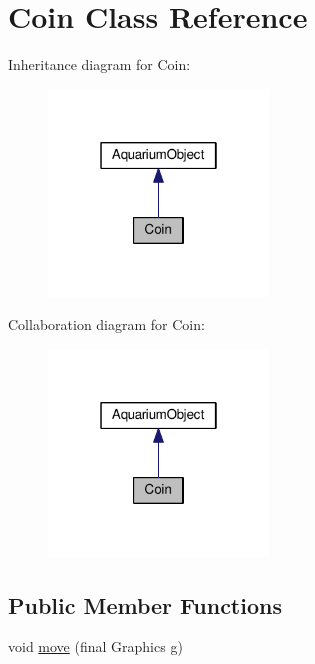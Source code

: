 \hypertarget{class_coin}{}\section{Coin Class Reference}
\label{class_coin}


Inheritance diagram for Coin\+:
\nopagebreak
\begin{figure}[H]
\begin{center}
\leavevmode
\includegraphics[width=166pt]{class_coin__inherit__graph}
\end{center}
\end{figure}


Collaboration diagram for Coin\+:
\nopagebreak
\begin{figure}[H]
\begin{center}
\leavevmode
\includegraphics[width=166pt]{class_coin__coll__graph}
\end{center}
\end{figure}
\subsection*{Public Member Functions}
\begin{DoxyCompactItemize}
\item 
void \mbox{\hyperlink{class_coin_a649f0d0db3acec80ad9d3967f8d272f1}{move}} (final Graphics g)
\end{DoxyCompactItemize}
